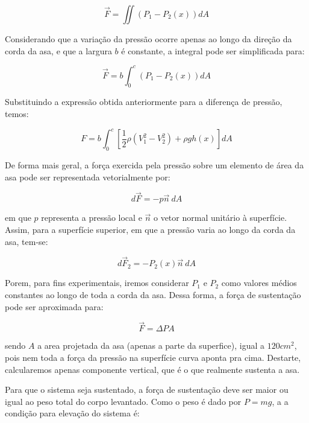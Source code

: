 \documentclass[12pt]{article}
\begin{document}
\begin{equation}
\textbf{$\vec{F}  = \iint(P_1 - P_2(x))dA$} 
\end{equation}

Considerando que a variação da pressão ocorre apenas ao longo da direção da corda da asa, e que a largura $b$ é constante, a integral pode ser simplificada para:

\begin{equation}
\textbf{$\vec{F}  = b\int_{0}^{c}(P_1 - P_2(x))dA$} 
\end{equation}

Substituindo a expressão obtida anteriormente para a diferença de pressão, temos:

\begin{equation}
\textbf{$F = b\int_{0}^{c} \left[\frac{1}{2}\rho (V_{1}^{2} - V_2^{2}) + \rho g h(x)\right]dA$} 
\end{equation}

De forma mais geral, a força exercida pela pressão sobre um elemento de área da asa pode ser representada vetorialmente por:

\begin{equation}
\textbf{$d\vec{F}  = -p \vec{n} \ dA$}
\end{equation}

em que $p$ representa a pressão local e $\vec{n}$ o vetor normal unitário à superfície. Assim, para a superfície superior, em que a pressão varia ao longo da corda da asa, tem-se:

\begin{equation}
\textbf{$d\vec{F}_2 = -P_2(x) \vec{n} \ dA$}
\end{equation}

Porem, para fins experimentais, iremos considerar $P_1$ e $P_2$ como valores médios constantes ao longo de toda a corda da asa. Dessa forma, a força de sustentação pode ser aproximada para:

\begin{equation}
\textbf{$\vec{F} = \Delta P A$}
\end{equation}

sendo $A$ a area projetada da asa (apenas a parte da superfice), igual a $120cm^2$, pois nem toda a força da pressão na superfície curva aponta pra cima. Destarte, calcularemos apenas componente vertical, que é o que realmente sustenta a asa.

Para que o sistema seja sustentado, a força de sustentação deve ser maior ou igual ao peso total do corpo levantado. Como o peso é dado por $P=mg$, a a condição para elevação do sistema é:
\end{document}

